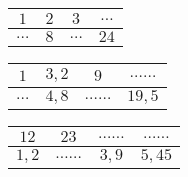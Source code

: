 \begin{pageParcoursu}
\begin{minipage}{0.3\linewidth}
\begin{tabular}{|c|c|c|c|}
\hline 
$1$ & $2$ & $3$ & $\ldots$  \\ 
\hline 
$\ldots$ & $8$ & $\ldots$ & $24$ \\ 
\hline 
\end{tabular} 
\end{minipage} 
\begin{minipage}{0.33\linewidth}
\begin{tabular}{|c|c|c|c|}
\hline 
$1$ & $3,2$ & $9$ & $\ldots\ldots$  \\ 
\hline 
$\ldots$ & $4,8$ & $\ldots\ldots$ & $19,5$ \\ 
\hline 
\end{tabular} 
\end{minipage} 
\begin{minipage}{0.33\linewidth}
\begin{tabular}{|c|c|c|c|}
\hline 
$12$ & $23$ & $\ldots\ldots$ & $\ldots\ldots$  \\ 
\hline 
$1,2$ & $\ldots\ldots$ & $3,9$ & $5,45$ \\ 
\hline 
\end{tabular} 
\end{minipage} 

\end{pageParcoursu}
